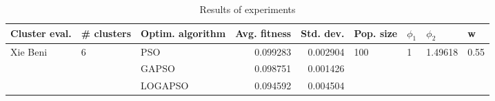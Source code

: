 \begin{table}
\centering
\caption{Results of experiments}
\begin{tabular}{lllrrllll}
\toprule
            Cluster eval. &        \# clusters & Optim. algorithm &  Avg. fitness &  Std. dev. &            Pop. size &         $\phi_{1}$ &               $\phi_{2}$ &                     w \\
\midrule
\multirow{3}{*}{Xie Beni} & \multirow{3}{*}{6} &              PSO &      0.099283 &   0.002904 & \multirow{3}{*}{100} & \multirow{3}{*}{1} & \multirow{3}{*}{1.49618} & \multirow{3}{*}{0.55} \\
                          &                    &            GAPSO &      0.098751 &   0.001426 &                      &                    &                          &                       \\
                          &                    &          LOGAPSO &      0.094592 &   0.004504 &                      &                    &                          &                       \\
\bottomrule
\end{tabular}
\end{table}
